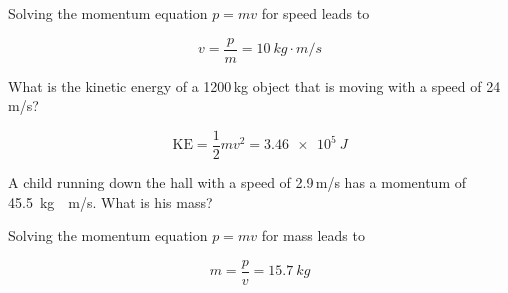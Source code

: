 \documentclass[../main-physics-problems.tex]{subfiles}
\begin{document}
\begin{questions}
\begin{solution}
Solving the momentum equation $p = mv$ for speed leads to

\begin{equation*}
    v = \frac{p}{m} = \boxed{\SI{10}{kg\cdot m/s}}
\end{equation*}
\end{solution}


     
\question %
What is the kinetic energy of a 1200\,kg object that is moving with a speed of 24\,m/s? 

\begin{solution}
\begin{equation*}
    \mathrm{KE} = \frac{1}{2} mv^2 = \boxed{\SI{3.46e5}{J}}
\end{equation*}
\end{solution}

\question %
A child running down the hall with a speed of 2.9\,m/s has a momentum of \SI{45.5}{kg\cdot m/s}. What is his mass?

\begin{solution}
Solving the momentum equation $p = mv$ for mass leads to 

\begin{equation*}
    m = \frac{p}{v} = \boxed{\SI{15.7}{kg}}
\end{equation*}
\end{solution}







\end{questions}
\end{document}
